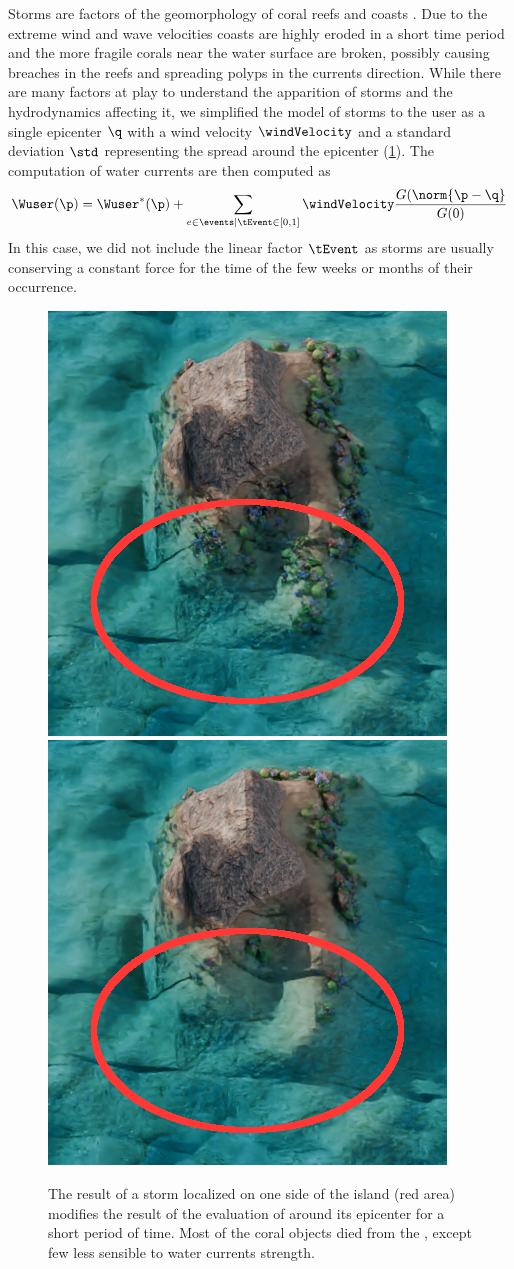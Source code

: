 Storms are factors of the geomorphology of coral reefs \cite{VilaConcejo2016, Oron2023} and coasts \cite{Dominguez2005, Cowart2010}. Due to the extreme wind and wave velocities coasts are highly eroded in a short time period and the more fragile corals near the water surface are broken, possibly causing breaches in the reefs and spreading polyps in the currents direction. While there are many factors at play to understand the apparition of storms and the hydrodynamics affecting it, we simplified the model of storms to the user as a single epicenter $\q$ with a wind velocity $\windVelocity$ and a standard deviation $\std$ representing the spread around the epicenter (\cref{fig:semantic-representation_storm-event}). The computation of water currents are then computed as 
\begin{align*}
    \Wuser(\p) = \Wuser^*(\p) + \sum_{e \in \events | \tEvent \in [0, 1]} {\windVelocity \frac{G(\norm{\p - \q}}{G(0)}}
\end{align*}
In this case, we did not include the linear factor $\tEvent$ as storms are usually conserving a constant force for the time of the few weeks or months of their occurrence. 

\begin{figure}
    \includegraphics[width = 0.45 \linewidth]{Figures/Interactions/interactionStorm1.png}
    \includegraphics[width = 0.45 \linewidth]{Figures/Interactions/interactionStorm2.png}
    \caption{The result of a storm localized on one side of the island (red area) modifies the result of the evaluation of  around its epicenter for a short period of time. Most of the coral objects died from the , except few  less sensible to water currents strength. }
    \label{fig:semantic-representation_storm-event}
\end{figure}

